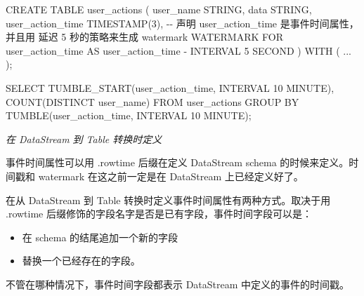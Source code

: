 \documentclass[cn,11pt,chinese]{elegantbook}
\newenvironment{Shaded}{}{}
\newcommand{\CharTok}[1]{\textcolor[rgb]{0.25,0.44,0.63}{#1}}
\newcommand{\DecValTok}[1]{\textcolor[rgb]{0.25,0.63,0.44}{#1}}
\newcommand{\FunctionTok}[1]{\textcolor[rgb]{0.02,0.16,0.49}{#1}}
\newcommand{\NormalTok}[1]{#1}
\providecommand{\tightlist}{%
  \setlength{\itemsep}{0pt}\setlength{\parskip}{0pt}}
\begin{document}
\begin{Shaded}
\begin{Highlighting}[]
\NormalTok{CREATE TABLE }\FunctionTok{user\_actions}\NormalTok{ (}
\NormalTok{  user\_name STRING,}
\NormalTok{  data STRING,}
\NormalTok{  user\_action\_time }\FunctionTok{TIMESTAMP}\NormalTok{(}\DecValTok{3}\NormalTok{),}
\NormalTok{  {-}{-} 声明 user\_action\_time 是事件时间属性，并且用 延迟 }\DecValTok{5}\NormalTok{ 秒的策略来生成 watermark}
\NormalTok{  WATERMARK FOR user\_action\_time AS user\_action\_time {-} INTERVAL }\CharTok{\textquotesingle{}5\textquotesingle{}}\NormalTok{ SECOND}
\NormalTok{) }\FunctionTok{WITH}\NormalTok{ (}
\NormalTok{  ...}
\NormalTok{);}

\NormalTok{SELECT }\FunctionTok{TUMBLE\_START}\NormalTok{(user\_action\_time, INTERVAL \textquotesingle{}}\DecValTok{10}\NormalTok{\textquotesingle{} MINUTE), }\FunctionTok{COUNT}\NormalTok{(DISTINCT user\_name)}
\NormalTok{FROM user\_actions}
\NormalTok{GROUP BY }\FunctionTok{TUMBLE}\NormalTok{(user\_action\_time, INTERVAL \textquotesingle{}}\DecValTok{10}\NormalTok{\textquotesingle{} MINUTE);}
\end{Highlighting}
\end{Shaded}

\emph{在 DataStream 到 Table 转换时定义}

事件时间属性可以用 .rowtime 后缀在定义 DataStream schema
的时候来定义。时间戳和 watermark 在这之前一定是在 DataStream
上已经定义好了。

在从 DataStream 到 Table 转换时定义事件时间属性有两种方式。取决于用
.rowtime 后缀修饰的字段名字是否是已有字段，事件时间字段可以是：

\begin{itemize}
\tightlist
\item
  在 schema 的结尾追加一个新的字段
\item
  替换一个已经存在的字段。
\end{itemize}

不管在哪种情况下，事件时间字段都表示 DataStream 中定义的事件的时间戳。
\end{document}
